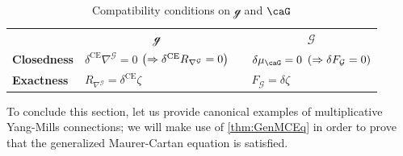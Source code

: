 \documentclass[reqno,a4paper,oneside]{amsart}
\newcommand\mutot{\mu_\caG}
\theoremstyle{plain}
\theoremstyle{remark}
\theoremstyle{definition}
\begin{document}
\begin{table}[htbp]
	\centering
		\caption{Compatibility conditions on $\mathcal{g}$ and $\caG$} 
		\begin{tabular}{llll}
			& \multicolumn{1}{c}{$\mathcal{g}$} && \multicolumn{1}{c}{$\mathcal{G}$}
			\vspace{.2cm}\\
			\textbf{Closedness}
	& $\delta^{\mathrm{CE}}\nabla^{\mathcal{G}} = 0$ $\mleft(\Rightarrow \delta^{\mathrm{CE}}R_{\nabla^{\mathcal{G}}} = 0\mright)$
	&& $\delta\mutot = 0$ $\mleft(\Rightarrow \delta F_{\mathcal{G}} = 0\mright)$
	\\
	\textbf{Exactness}
		& $R_{\nabla^{\mathcal{G}}} = \delta^{\mathrm{CE}}\zeta$
		&& $F_{\mathcal{G}} = \delta \zeta$
		\\
		\end{tabular}
	\label{tab:CompatibilityConditionsOnLGBAndItsLAB}
\end{table}

To conclude this section, let us provide canonical examples of multiplicative Yang-Mills connections; we will make use of \ref{thm:GenMCEq} in order to prove that the generalized Maurer-Cartan equation is satisfied.
\end{document}
